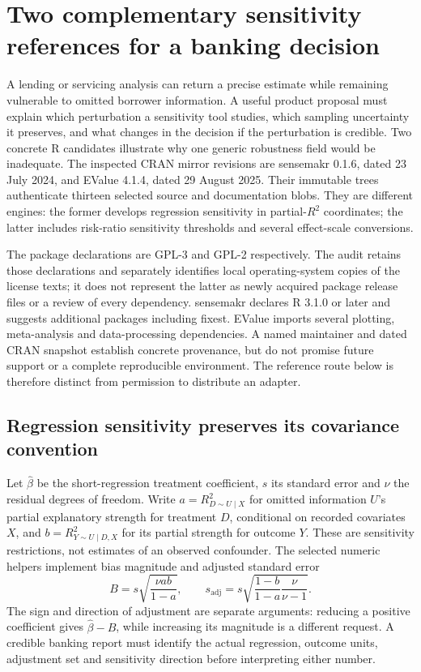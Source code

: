 \section{Two complementary sensitivity references for a banking decision}
\label{exec23:sensitivity-reuse-scope}
A lending or servicing analysis can return a precise estimate while remaining
vulnerable to omitted borrower information. A useful product proposal must
explain which perturbation a sensitivity tool studies, which sampling
uncertainty it preserves, and what changes in the decision if the perturbation
is credible. Two concrete R candidates illustrate why one generic robustness
field would be inadequate. The inspected CRAN mirror revisions are
sensemakr 0.1.6, dated 23 July 2024, and EValue 4.1.4, dated 29 August 2025.
Their immutable trees authenticate thirteen selected source and documentation
blobs. They are different engines: the former develops regression sensitivity
in partial-$R^2$ coordinates; the latter includes risk-ratio sensitivity
thresholds and several effect-scale conversions.
\citep{exec23_sensitivity_sensemakr,exec23_sensitivity_evalue}

The package declarations are GPL-3 and GPL-2 respectively. The audit retains
those declarations and separately identifies local operating-system copies of
the license texts; it does not represent the latter as newly acquired package
release files or a review of every dependency. sensemakr declares R 3.1.0 or
later and suggests additional packages including fixest. EValue imports
several plotting, meta-analysis and data-processing dependencies. A named
maintainer and dated CRAN snapshot establish concrete provenance, but do not
promise future support or a complete reproducible environment. The reference
route below is therefore distinct from permission to distribute an adapter.
\citep{exec23_sensitivity_sensemakr,exec23_sensitivity_evalue}

\subsection{Regression sensitivity preserves its covariance convention}
\label{exec23:sensitivity-reuse-regression}
Let $\widehat\beta$ be the short-regression treatment coefficient, $s$ its
standard error and $\nu$ the residual degrees of freedom. Write
$a=R^2_{D\sim U\mid X}$ for omitted information $U$'s partial explanatory
strength for treatment $D$, conditional on recorded covariates $X$, and
$b=R^2_{Y\sim U\mid D,X}$ for its partial strength for outcome $Y$.
These are sensitivity restrictions, not estimates of an observed confounder.
The selected numeric helpers implement bias magnitude and adjusted standard
error
\[
 B=s\sqrt{\frac{\nu ab}{1-a}},\qquad
 s_{\mathrm{adj}}=s\sqrt{\frac{1-b}{1-a}\frac{\nu}{\nu-1}}.
\]
The sign and direction of adjustment are separate arguments: reducing a
positive coefficient gives $\widehat\beta-B$, while increasing its magnitude
is a different request. A credible banking report must identify the actual
regression, outcome units, adjustment set and sensitivity direction before
interpreting either number.
\citep{exec23_sensitivity_sensemakr}

